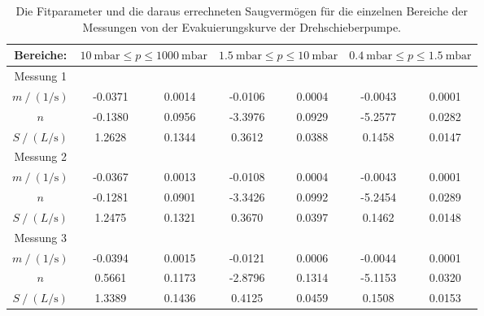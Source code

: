     \begin{table}[h]
      \centering
      \caption{Die Fitparameter und die daraus errechneten Saugvermögen für die einzelnen Bereiche der Messungen von der Evakuierungskurve der Drehschieberpumpe.}
      \label{tab:fitpara_dreh_alt}
      \begin{tabular}{c | S[table-format=2.4] @{${}\pm{}$} S  S[table-format=2.4] @{${}\pm{}$} S  S[table-format=2.4] @{${}\pm{}$} S}
        \toprule
        {Bereiche:} &  &  & \\
        \midrule
        Messung 1 \\ 
        \cmidrule(lr){1-1}
        $m \mathbin{/} \left(\si{1\per\second}\right)$ & -0.0371 & 0.0014 & -0.0106 & 0.0004 & -0.0043 & 0.0001 \\
        $n$                                            & -0.1380 & 0.0956 & -3.3976 & 0.0929 & -5.2577 & 0.0282 \\
        $S \mathbin{/} \left(\si{L\per\second}\right)$ &  1.2628 & 0.1344 &  0.3612 & 0.0388 &  0.1458 & 0.0147 \\
        \midrule
        Messung 2 \\ 
        \cmidrule(lr){1-1}
        $m \mathbin{/} \left(\si{1\per\second}\right)$ & -0.0367 & 0.0013 & -0.0108 & 0.0004 & -0.0043 & 0.0001 \\
        $n$                                            & -0.1281 & 0.0901 & -3.3426 & 0.0992 & -5.2454 & 0.0289 \\
        $S \mathbin{/} \left(\si{L\per\second}\right)$ &  1.2475 & 0.1321 &  0.3670 & 0.0397 &  0.1462 & 0.0148 \\
        \midrule
        Messung 3 \\ 
        \cmidrule(lr){1-1}
        $m \mathbin{/} \left(\si{1\per\second}\right)$ & -0.0394 & 0.0015 & -0.0121 & 0.0006 & -0.0044 & 0.0001 \\
        $n$                                            &  0.5661 & 0.1173 & -2.8796 & 0.1314 & -5.1153 & 0.0320 \\
        $S \mathbin{/} \left(\si{L\per\second}\right)$ &  1.3389 & 0.1436 &  0.4125 & 0.0459 &  0.1508 & 0.0153 \\      
        \bottomrule
      \end{tabular}
    \end{table}


